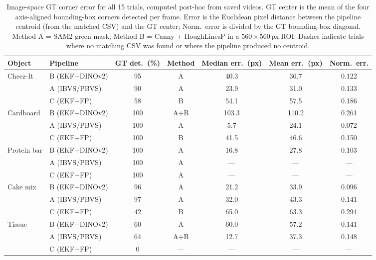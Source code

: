 \documentclass[letterpaper, 10 pt, conference]{ieeeconf}  %
\begin{document}
\begin{table}[t]
\centering
\caption{Image-space GT corner error for all 15 trials, computed post-hoc from saved videos. GT center is the mean of the four axis-aligned bounding-box corners detected per frame. Error is the Euclidean pixel distance between the pipeline centroid (from the matched CSV) and the GT center; Norm.\ error is divided by the GT bounding-box diagonal. Method A = SAM2 green-mask; Method B = Canny + HoughLinesP in a $560\times560$\,px ROI. Dashes indicate trials where no matching CSV was found or where the pipeline produced no centroid.}
\label{tab:gt_corner}
\footnotesize
\begin{tabular}{@{}llccccc@{}}
\toprule
Object & Pipeline & GT det.\ (\%) & Method & Median err.\ (px) & Mean err.\ (px) & Norm.\ err. \\
\midrule
\multirow{3}{*}{Cheez-It}
  & B (EKF+DINOv2) & 95 & A     & 40.3 & 36.7 & 0.122 \\
  & A (IBVS/PBVS)  & 90 & A     & 23.9 & 31.0 & 0.133 \\
  & C (EKF+FP)     & 58 & B     & 54.1 & 57.5 & 0.186 \\
\midrule
\multirow{3}{*}{Cardboard}
  & B (EKF+DINOv2) & 100 & A+B  & 103.3 & 110.2 & 0.261 \\
  & A (IBVS/PBVS)  & 100 & A    &   5.7 &  24.1 & 0.072 \\
  & C (EKF+FP)     & 100 & B    &  41.5 &  46.6 & 0.150 \\
\midrule
\multirow{3}{*}{Protein bar}
  & B (EKF+DINOv2) & 100 & A    & 16.8 & 27.8 & 0.103 \\
  & A (IBVS/PBVS)  & 100 & A    & ---  & ---  & ---   \\
  & C (EKF+FP)     & 100 & A    & ---  & ---  & ---   \\
\midrule
\multirow{3}{*}{Cake mix}
  & B (EKF+DINOv2) & 96 & A     & 21.2 & 33.9 & 0.096 \\
  & A (IBVS/PBVS)  & 97 & A     & 32.0 & 43.3 & 0.141 \\
  & C (EKF+FP)     & 42 & B     & 65.0 & 63.3 & 0.294 \\
\midrule
\multirow{3}{*}{Tissue}
  & B (EKF+DINOv2) & 60 & A     & 60.0 & 57.2 & 0.141 \\
  & A (IBVS/PBVS)  & 64 & A+B   & 12.7 & 37.3 & 0.148 \\
  & C (EKF+FP)     &  0 & ---   & ---  & ---  & ---   \\
\bottomrule
\end{tabular}
\end{table}
\end{document}
